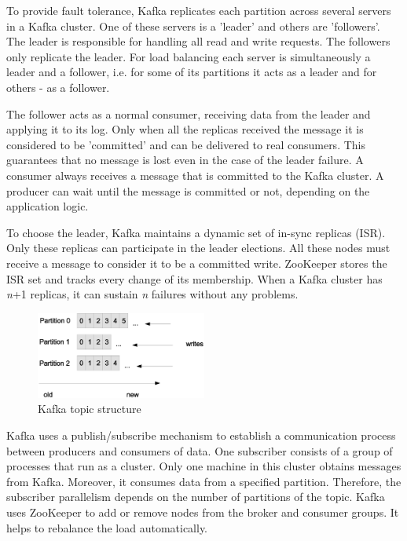 To provide fault tolerance, Kafka replicates each partition across several servers in a Kafka cluster.
One of these servers is a 'leader' and others are 'followers'.
The leader is responsible for handling all read and write requests.
The followers only replicate the leader.
For load balancing each server is simultaneously a leader and a follower, i.e. for some of its partitions it acts as a leader and for others - as a follower.

The follower acts as a normal consumer, receiving data from the leader and applying it to its log.
Only when all the replicas received the message it is considered to be 'committed' and can be delivered to real consumers.
This guarantees that no message is lost even in the case of the leader failure.
A consumer always receives a message that is committed to the Kafka cluster.
A producer can wait until the message is committed or not, depending on the application logic.

To choose the leader, Kafka maintains a dynamic set of in-sync replicas (ISR).
Only these replicas can participate in the leader elections.
All these nodes must receive a message to consider it to be a committed write.
ZooKeeper stores the ISR set and tracks every change of its membership.
When a Kafka cluster has \textit{n}+1 replicas, it can sustain \textit{n} failures without any problems.

\begin{figure}[h]
  \centering
  \includegraphics [width=0.5\textwidth]{images/kafka_topic_structure}
  \caption{Kafka topic structure}
  \label{fig:kafka_topic_structure}
\end{figure} 

Kafka uses a publish/subscribe mechanism to establish a communication process between producers and consumers of data.
One subscriber consists of a group of processes that run as a cluster.
Only one machine in this cluster obtains messages from Kafka.
Moreover, it consumes data from a specified partition.
Therefore, the subscriber parallelism depends on the number of partitions of the topic.
Kafka uses ZooKeeper to add or remove nodes from the broker and consumer groups.
It helps to rebalance the load automatically.

